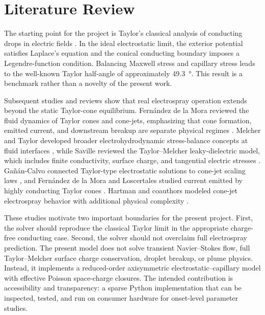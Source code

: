 \section{Literature Review}

The starting point for the project is Taylor's classical analysis of conducting drops in electric fields \cite{taylor1964disintegration}. In the ideal electrostatic limit, the exterior potential satisfies Laplace's equation and the conical conducting boundary imposes a Legendre-function condition. Balancing Maxwell stress and capillary stress leads to the well-known Taylor half-angle of approximately \SI{49.3}{\degree}. This result is a benchmark rather than a novelty of the present work.

Subsequent studies and reviews show that real electrospray operation extends beyond the static Taylor-cone equilibrium. Fern\'andez de la Mora reviewed the fluid dynamics of Taylor cones and cone-jets, emphasizing that cone formation, emitted current, and downstream breakup are separate physical regimes \cite{fernandez2007fluid}. Melcher and Taylor developed broader electrohydrodynamic stress-balance concepts at fluid interfaces \cite{melcher1969electrohydrodynamics}, while Saville reviewed the Taylor--Melcher leaky-dielectric model, which includes finite conductivity, surface charge, and tangential electric stresses \cite{saville1997electrohydrodynamics}. Gañán-Calvo connected Taylor-type electrostatic solutions to cone-jet scaling laws \cite{ganan1997conejet}, and Fern\'andez de la Mora and Loscertales studied current emitted by highly conducting Taylor cones \cite{fernandez1994current}. Hartman and coauthors modeled cone-jet electrospray behavior with additional physical complexity \cite{hartman1999electrohydrodynamic}.

These studies motivate two important boundaries for the present project. First, the solver should reproduce the classical Taylor limit in the appropriate charge-free conducting case. Second, the solver should not overclaim full electrospray prediction. The present model does not solve transient Navier--Stokes flow, full Taylor--Melcher surface charge conservation, droplet breakup, or plume physics. Instead, it implements a reduced-order axisymmetric electrostatic--capillary model with effective Poisson space-charge closures. The intended contribution is accessibility and transparency: a sparse Python implementation that can be inspected, tested, and run on consumer hardware for onset-level parameter studies.
